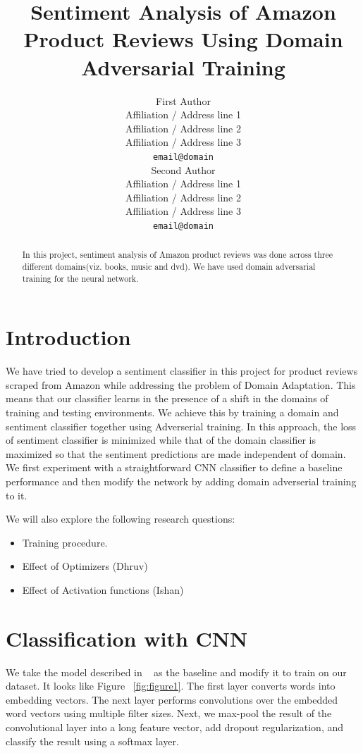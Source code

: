 \documentclass[11pt,a4paper]{article}
\title{Sentiment Analysis of Amazon Product Reviews Using Domain Adversarial Training}
\author{First Author \\
  Affiliation / Address line 1 \\
  Affiliation / Address line 2 \\
  Affiliation / Address line 3 \\
  {\tt email@domain} \\\And
  Second Author \\
  Affiliation / Address line 1 \\
  Affiliation / Address line 2 \\
  Affiliation / Address line 3 \\
  {\tt email@domain} \\}
\date{}
\begin{document}
\maketitle
\begin{abstract}
  In this project, sentiment analysis of Amazon product reviews was
  done across three different domains(viz. books, music and dvd). We
  have used domain adversarial training for the neural network.
\end{abstract}

\section{Introduction}

We have tried to develop a sentiment classifier in this project for product reviews scraped from Amazon while addressing the problem of Domain Adaptation. This means that our classifier learns in the presence of a shift in the domains of training and testing environments. We achieve this by training a domain and sentiment classifier together using Adverserial training. In this approach, the loss of sentiment classifier is minimized while that of the domain classifier is maximized so that the sentiment predictions are made independent of domain. We first experiment with a straightforward CNN classifier to define a baseline performance and then modify the network by adding domain adverserial training to it.

We will also explore the following research questions:
\begin{itemize}
  \item Training procedure.
  \item Effect of Optimizers (Dhruv)
  \item Effect of Activation functions (Ishan)
\end{itemize}

\section{Classification with CNN}

We take the model described in ~\cite{Britz} as the baseline and modify it to train on our dataset. It looks like Figure ~\ref{fig:figure1}. The first layer converts words into embedding vectors. The next layer performs convolutions over the embedded word vectors using multiple filter sizes. Next, we max-pool the result of the convolutional layer into a long feature vector, add dropout regularization, and classify the result using a softmax layer.
\end{document}
